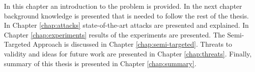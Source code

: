 In this chapter an introduction to the problem is provided. In the next chapter background knowledge is presented that is needed to follow the rest of the thesis. In Chapter \ref{chap:attacks} state-of-the-art attacks are presented and explained. In Chapter \ref{chap:experiments} results of the experiments are presented. The Semi-Targeted Approach is discussed in Chapter \ref{chap:semi-targeted}. Threats to validity and ideas for future work are presented in Chapter \ref{chap:threats}. Finally, summary of this thesis is presented in Chapter \ref{chap:summary}.